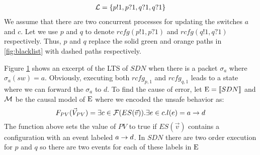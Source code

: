 \begin{example}
\begin{equation*}
\begin{aligned}[c]
            \mathcal{L} & = \{p!1,p?1,q?1,q?1\}                \\
        \end{aligned}
    \end{equation*}
    We assume that there are two concurrent processes for updating
    the switches $a$ and $c$.
    Let we use $p$ and $q$ to denote $rcfg(p!1,p?1)$ and
    $rcfg(q!1,q?1)$ respectively.
    Thus, $p$ and $q$ replace the solid green and orange
    paths in \ref{fig:blacklist} with dashed paths respectively.
    \begin{figure}
        \centering
        \caption{}
        \label{fig:blacklist:lts}
    \end{figure}
    Figure \ref{fig:blacklist:lts} shows an excerpt of the LTS of $SDN$ 
    when there is a packet $\sigma_a$ where $\sigma_a(sw) = a$.
    Obviously, executing both $rcfg_{p,1}$ and $rcfg_{q,1}$ leads
    to a state where we can forward the $\sigma_a$ to $d$.
    To find the cause of error, let $\mathrm{E} = \llbracket SDN \rrbracket$ and $\mathcal{M}$ 
    be the causal model of $\mathrm{E}$ where we encoded the unsafe behavior 
    as:
    \begin{equation*}
        F_{PV}(\vec V_{PV}) = \exists c \in \mathcal{F}(ES(\vec v)). \exists e \in c. l(e) = a\rightarrow d
    \end{equation*}
    The function above sets the value of $PV$ to true if $ES(\vec v)$ 
    contains a configuration with an event labeled $a \rightarrow d$.
    In $SDN$ there are two order execution for $p$ and $q$ so
    there are two events for each of these labels in $\mathrm{E}$ 

\end{example}

